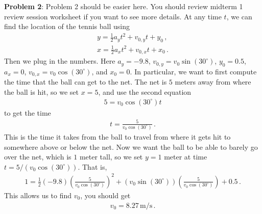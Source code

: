 \documentclass[11pt]{article}
\begin{document}
 

\textbf{Problem 2}: Problem 2 should be easier here. You should review midterm 1 review session worksheet if you want to see more details. At any time $t$, we can find the location of the tennis ball using
\begin{align*}
y = \frac{1}{2}a_y t^2 + v_{0,y}t  + y_0\,,\\
x = \frac{1}{2}a_x t^2 + v_{0,x}t  + x_0\,.
\end{align*}
Then we plug in the numbers. Here $a_y = -9.8$, $v_{0,y} = v_0 \sin(30^\circ)$, $y_0 = 0.5$, $a_x = 0$, $v_{0,x} = v_0 \cos(30^\circ)$, and $x_0 = 0$. In particular, we want to first compute the time that the ball can get to the net. The net is $5$ meters away from where the ball is hit, so we set $x = 5$, and use the second equation 
\begin{align*}
5 = v_0 \cos(30^\circ) t
\end{align*}
to get the time
\begin{align*}
t = \frac{5}{v_0 \cos(30^\circ)}\,.
\end{align*}
This is the time it takes from the ball to travel from where it gets hit to somewhere above or below the net. Now we want the ball to be able to barely go over the net, which is $1$ meter tall, so we set $y = 1$ meter at time $t = 5/(v_0 \cos(30^\circ))$. That is, 
\begin{align*}
1 = \frac{1}{2}(-9.8) \left( \frac{5}{v_0 \cos(30^\circ)}\right)^2 + \left(v_0 \sin(30^\circ) \right)\left(\frac{5}{v_0 \cos(30^\circ)}\right) + 0.5\,.
\end{align*} 
This allows us to find $v_0$, you should get
\begin{align*}
v_ 0 =8.27\,\text{m/s}\,.
\end{align*}
\end{document}
